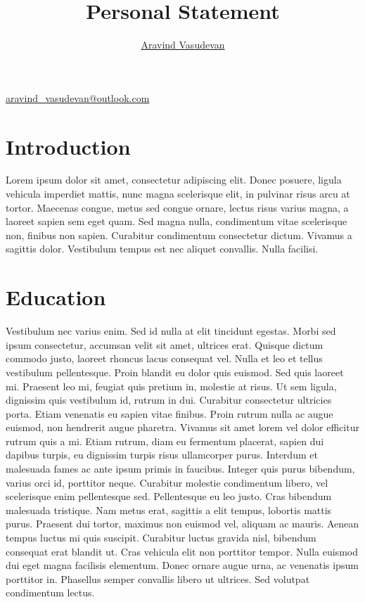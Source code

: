 \documentclass[12pt, letterpaper]{article}
\title{Personal Statement}
\author{\href{https://aravindvasudev.github.io/}{Aravind Vasudevan}}
\makeatletter
\newcommand{\email}{\href{mailto:aravind_vasudevan@outlook.com}{aravind\_vasudevan@outlook.com}}
\renewcommand{\maketitle}{
  \begin{center}
    {\color{headingcolor} \Huge \scshape \@title}
    \vspace{0.5em}
    \color[HTML]{2e4b64}{\rule{\linewidth}{0.5mm}}
    \par
    {\normalsize \color{headingcolor} \@author \hfill \email}
    \vspace{0.2em}
  \end{center}
}
\makeatother
\begin{document}
\maketitle

\section*{Introduction}
Lorem ipsum dolor sit amet, consectetur adipiscing elit. Donec posuere, ligula vehicula imperdiet mattis, nunc magna scelerisque elit, in pulvinar risus arcu at tortor. Maecenas congue, metus sed congue ornare, lectus risus varius magna, a laoreet sapien sem eget quam. Sed magna nulla, condimentum vitae scelerisque non, finibus non sapien. Curabitur condimentum consectetur dictum. Vivamus a sagittis dolor. Vestibulum tempus est nec aliquet convallis. Nulla facilisi.

\section*{Education}
Vestibulum nec varius enim. Sed id nulla at elit tincidunt egestas. Morbi sed ipsum consectetur, accumsan velit sit amet, ultrices erat. Quisque dictum commodo justo, laoreet rhoncus lacus consequat vel. Nulla et leo et tellus vestibulum pellentesque. Proin blandit eu dolor quis euismod. Sed quis laoreet mi. Praesent leo mi, feugiat quis pretium in, molestie at risus. Ut sem ligula, dignissim quis vestibulum id, rutrum in dui. Curabitur consectetur ultricies porta. Etiam venenatis eu sapien vitae finibus. Proin rutrum nulla ac augue euismod, non hendrerit augue pharetra. Vivamus sit amet lorem vel dolor efficitur rutrum quis a mi. Etiam rutrum, diam eu fermentum placerat, sapien dui dapibus turpis, eu dignissim turpis risus ullamcorper purus. Interdum et malesuada fames ac ante ipsum primis in faucibus. Integer quis purus bibendum, varius orci id, porttitor neque. Curabitur molestie condimentum libero, vel scelerisque enim pellentesque sed. Pellentesque eu leo justo. Cras bibendum malesuada tristique. Nam metus erat, sagittis a elit tempus, lobortis mattis purus. Praesent dui tortor, maximus non euismod vel, aliquam ac mauris. Aenean tempus luctus mi quis suscipit. Curabitur luctus gravida nisl, bibendum consequat erat blandit ut. Cras vehicula elit non porttitor tempor. Nulla euismod dui eget magna facilisis elementum. Donec ornare augue urna, ac venenatis ipsum porttitor in. Phasellus semper convallis libero ut ultrices. Sed volutpat condimentum lectus.
\end{document}
